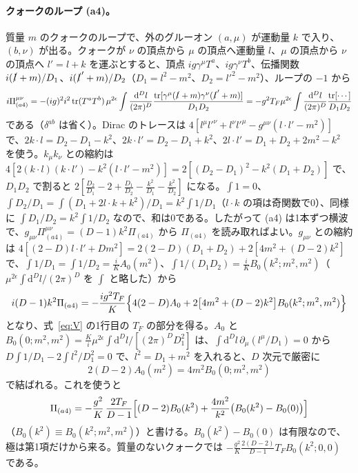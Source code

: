 \documentclass[a4paper,10pt]{ltjsarticle}
\newcommand{\dd}{\mathrm{d}}
\newcommand{\tr}{\mathrm{tr}}
\begin{document}
\paragraph{クォークのループ (a4)。}質量 $m$ のクォークのループで、外のグルーオン $(a,\mu)$ が運動量 $k$ で入り、$(b,\nu)$ が出る。クォークが $\nu$ の頂点から $\mu$ の頂点へ運動量 $l$、$\mu$ の頂点から $\nu$ の頂点へ $l'=l+k$ を運ぶとすると、頂点 $ig\gamma^\mu T^a$、$ig\gamma^\nu T^b$、伝播関数 $i(\slashed l+m)/D_1$、$i(\slashed l'+m)/D_2$（$D_1=l^2-m^2$、$D_2=l'^2-m^2$）、ループの $-1$ から
\begin{equation*}
i\Pi^{\mu\nu}_{(a4)}=-(ig)^2i^2\,\tr(T^aT^b)\,\mu^{2\epsilon}\int\frac{\dd^Dl}{(2\pi)^D}\frac{\tr[\gamma^\mu(\slashed l+m)\gamma^\nu(\slashed l'+m)]}{D_1D_2}
=-g^2T_F\mu^{2\epsilon}\int\frac{\dd^Dl}{(2\pi)^D}\frac{\tr[\cdots]}{D_1D_2}
\end{equation*}
である（$\delta^{ab}$ は省く）。Dirac のトレースは $4[l^\mu l'^\nu+l^\nu l'^\mu-g^{\mu\nu}(l\cdot l'-m^2)]$ で、$2k\cdot l=D_2-D_1-k^2$、$2k\cdot l'=D_2-D_1+k^2$、$2l\cdot l'=D_1+D_2+2m^2-k^2$ を使う。$k_\mu k_\nu$ との縮約は $4[2(k\cdot l)(k\cdot l')-k^2(l\cdot l'-m^2)]=2[(D_2-D_1)^2-k^2(D_1+D_2)]$ で、$D_1D_2$ で割ると $2[\frac{D_2}{D_1}-2+\frac{D_1}{D_2}-\frac{k^2}{D_1}-\frac{k^2}{D_2}]$ になる。$\int1=0$、$\int D_2/D_1=\int(D_1+2l\cdot k+k^2)/D_1=k^2\int1/D_1$（$l\cdot k$ の項は奇関数で0）、同様に $\int D_1/D_2=k^2\int1/D_2$ なので、和は0である。したがって (a4) は1本ずつ横波で、$g_{\mu\nu}\Pi^{\mu\nu}_{(a4)}=(D-1)k^2\Pi_{(a4)}$ から $\Pi_{(a4)}$ を読み取ればよい。$g_{\mu\nu}$ との縮約は $4[(2-D)l\cdot l'+Dm^2]=2(2-D)(D_1+D_2)+2[4m^2+(D-2)k^2]$ で、$\int1/D_1=\int1/D_2=\frac iKA_0(m^2)$、$\int1/(D_1D_2)=\frac iKB_0(k^2;m^2,m^2)$（$\mu^{2\epsilon}\int\dd^Dl/(2\pi)^D$ を $\int$ と略した）から
\begin{equation*}
i(D-1)k^2\Pi_{(a4)}=-\frac{ig^2T_F}{K}\Bigl\{4(2-D)A_0+2\bigl[4m^2+(D-2)k^2\bigr]B_0(k^2;m^2,m^2)\Bigr\}
\end{equation*}
となり、式~\eqref{eq:V} の1行目の $T_F$ の部分を得る。$A_0$ と $B_0(0;m^2,m^2)=\frac Ki\mu^{2\epsilon}\int\dd^Dl/[(2\pi)^DD_1^2]$ は、$\int\dd^Dl\,\partial_\mu(l^\mu/D_1)=0$ から $D\int1/D_1-2\int l^2/D_1^2=0$ で、$l^2=D_1+m^2$ を入れると、$D$ 次元で厳密に
\begin{equation*}
2(D-2)A_0(m^2)=4m^2B_0(0;m^2,m^2)
\end{equation*}
で結ばれる。これを使うと
\begin{equation*}
\Pi_{(a4)}=-\frac{g^2}{K}\,\frac{2T_F}{D-1}\Bigl[(D-2)B_0(k^2)+\frac{4m^2}{k^2}\bigl(B_0(k^2)-B_0(0)\bigr)\Bigr]
\end{equation*}
（$B_0(k^2)\equiv B_0(k^2;m^2,m^2)$）と書ける。$B_0(k^2)-B_0(0)$ は有限なので、極は第1項だけから来る。質量のないクォークでは $-\frac{g^2}K\frac{2(D-2)}{D-1}T_FB_0(k^2;0,0)$ である。
\end{document}

